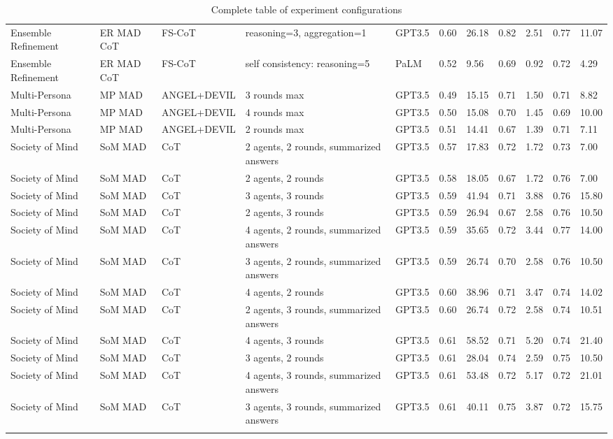 \begin{landscape}
\begin{longtable}{lllllllllll}
Ensemble Refinement & ER MAD CoT & FS-CoT & reasoning=3, aggregation=1 & GPT3.5 & 0.60 & 26.18 & 0.82 & 2.51 & 0.77 & 11.07 \\
Ensemble Refinement & ER MAD CoT & FS-CoT & self consistency: reasoning=5 & PaLM & 0.52 & 9.56 & 0.69 & 0.92 & 0.72 & 4.29 \\
Multi-Persona & MP MAD & ANGEL+DEVIL & 3 rounds max & GPT3.5 & 0.49 & 15.15 & 0.71 & 1.50 & 0.71 & 8.82 \\
Multi-Persona & MP MAD & ANGEL+DEVIL & 4 rounds max & GPT3.5 & 0.50 & 15.08 & 0.70 & 1.45 & 0.69 & 10.00 \\
Multi-Persona & MP MAD & ANGEL+DEVIL & 2 rounds max & GPT3.5 & 0.51 & 14.41 & 0.67 & 1.39 & 0.71 & 7.11 \\
Society of Mind & SoM MAD & CoT & 2 agents, 2 rounds, summarized answers & GPT3.5 & 0.57 & 17.83 & 0.72 & 1.72 & 0.73 & 7.00 \\
Society of Mind & SoM MAD & CoT & 2 agents, 2 rounds & GPT3.5 & 0.58 & 18.05 & 0.67 & 1.72 & 0.76 & 7.00 \\
Society of Mind & SoM MAD & CoT & 3 agents, 3 rounds & GPT3.5 & 0.59 & 41.94 & 0.71 & 3.88 & 0.76 & 15.80 \\
Society of Mind & SoM MAD & CoT & 2 agents, 3 rounds & GPT3.5 & 0.59 & 26.94 & 0.67 & 2.58 & 0.76 & 10.50 \\
Society of Mind & SoM MAD & CoT & 4 agents, 2 rounds, summarized answers & GPT3.5 & 0.59 & 35.65 & 0.72 & 3.44 & 0.77 & 14.00 \\
Society of Mind & SoM MAD & CoT & 3 agents, 2 rounds, summarized answers & GPT3.5 & 0.59 & 26.74 & 0.70 & 2.58 & 0.76 & 10.50 \\
Society of Mind & SoM MAD & CoT & 4 agents, 2 rounds & GPT3.5 & 0.60 & 38.96 & 0.71 & 3.47 & 0.74 & 14.02 \\
Society of Mind & SoM MAD & CoT & 2 agents, 3 rounds, summarized answers & GPT3.5 & 0.60 & 26.74 & 0.72 & 2.58 & 0.74 & 10.51 \\
Society of Mind & SoM MAD & CoT & 4 agents, 3 rounds & GPT3.5 & 0.61 & 58.52 & 0.71 & 5.20 & 0.74 & 21.40 \\
Society of Mind & SoM MAD & CoT & 3 agents, 2 rounds & GPT3.5 & 0.61 & 28.04 & 0.74 & 2.59 & 0.75 & 10.50 \\
Society of Mind & SoM MAD & CoT & 4 agents, 3 rounds, summarized answers & GPT3.5 & 0.61 & 53.48 & 0.72 & 5.17 & 0.72 & 21.01 \\
Society of Mind & SoM MAD & CoT & 3 agents, 3 rounds, summarized answers & GPT3.5 & 0.61 & 40.11 & 0.75 & 3.87 & 0.72 & 15.75 \\

\caption{Complete table of experiment configurations}\label{app:tab:full-results-table}

\end{longtable}
\end{landscape}

